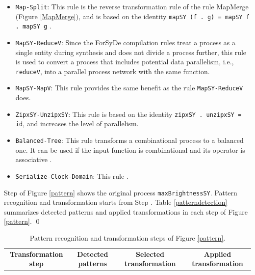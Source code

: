 \begin{exmp}
\begin{itemize}[leftmargin=*]
	\setlength{\parskip}{1pt} 
	\setlength{\itemsep}{0pt plus 0pt}
    \item \texttt{Map-Split}: This rule is the reverse transformation rule of the rule MapMerge (Figure \ref{MapMerge}), and is based on the identity \texttt{mapSY (f . g) = mapSY f . mapSY g} \cite{sander2004system}.
    \item \texttt{MapSY-ReduceV}: Since the ForSyDe compilation rules treat a process as a single entity during synthesis and does not divide a process further, this rule is used to convert a process that includes potential data parallelism, i.e., \texttt{reduceV}, into a parallel process network with the same function.
    \item \texttt{MapSY-MapV}: This rule provides the same benefit as the  rule \texttt{MapSY-ReduceV} does. 
    \item \texttt{ZipxSY-UnzipxSY}: This rule is based on the identity \texttt{zipxSY . unzipxSY = id}, and increases the level of parallelism.
    \item \texttt{Balanced-Tree}: This rule transforms a combinational process to a balanced one. It can be used if the input function is combinational and its operator is associative \cite{sander2004system}.
    \item \texttt{Serialize-Clock-Domain}: This rule  \cite{sander2004system}.
\end{itemize}
Step  of Figure \ref{pattern} shows the original process  \texttt{maxBrightnessSY}. Pattern recognition and transformation starts from Step . 
Table \ref{patterndetection} summarizes detected patterns and applied transformations in each step of Figure \ref{pattern}. \qed
\begin{table}[t]
    \centering
    \caption{Pattern recognition and transformation steps of Figure \ref{pattern}.}
    \begin{tabular}{c||c|c|c}
        \hline
        \textbf{Transformation step} & \textbf{Detected patterns} & \textbf{Selected transformation} & \textbf{Applied transformation} \\

\end{tabular}
\end{table}
\end{exmp}

